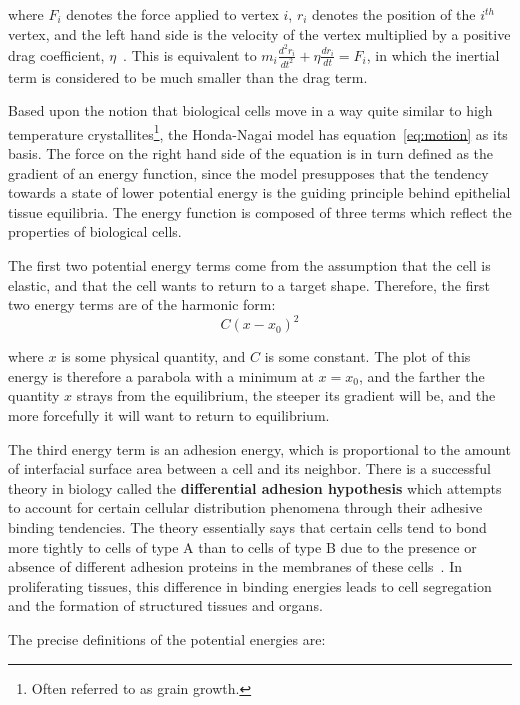 where $F_i$ denotes the force applied to vertex $i$, $r_i$ denotes the position of the $i^{th}$ vertex,  and the left hand side is the velocity of the vertex multiplied by a positive drag coefficient, $\eta$~\cite{1989Kawasaki}. This is equivalent to $m_i\frac{d^2r_i}{dt^2} + \eta\frac{dr_i}{dt} = F_i$, in which the 
inertial term is considered to be much smaller than the drag term.

Based upon the notion that biological cells move in a way quite similar to high temperature crystallites\footnote{Often referred to as grain growth.}, the Honda-Nagai model has equation~\ref{eq:motion} as its basis. The force on the right hand side of the equation is in turn defined as the gradient of an energy function, since the model presupposes that the tendency towards a state of lower potential energy is the guiding principle behind epithelial tissue equilibria. The energy function is composed of three terms which reflect the properties of biological cells.

The first two potential energy terms come from the assumption that the cell is elastic, and that the cell wants to return to a target shape. Therefore, the first two energy terms are of the harmonic form: 
\begin{equation}
C(x-x_0)^2
\end{equation}

where $x$ is some physical quantity, and $C$ is some constant. The plot of this energy is therefore a parabola with a minimum at $x =  x_0$, and the farther the quantity $x$ strays from the equilibrium, the steeper its gradient will be, and the more forcefully it will want to return to equilibrium.

The third energy term is an adhesion energy, which is proportional to the amount of interfacial surface area between a cell and its neighbor. There is a successful theory in biology called the \textbf{differential adhesion hypothesis} which attempts to account for certain cellular distribution phenomena through their adhesive binding tendencies. The theory essentially says that certain cells tend to bond more tightly to cells of type A than to cells of type B due to the presence or absence of different adhesion proteins in the membranes of these cells~\cite{DA}. In proliferating tissues, this difference in binding energies leads to cell segregation and the formation of structured tissues and organs. 

The precise definitions of the potential energies are:

